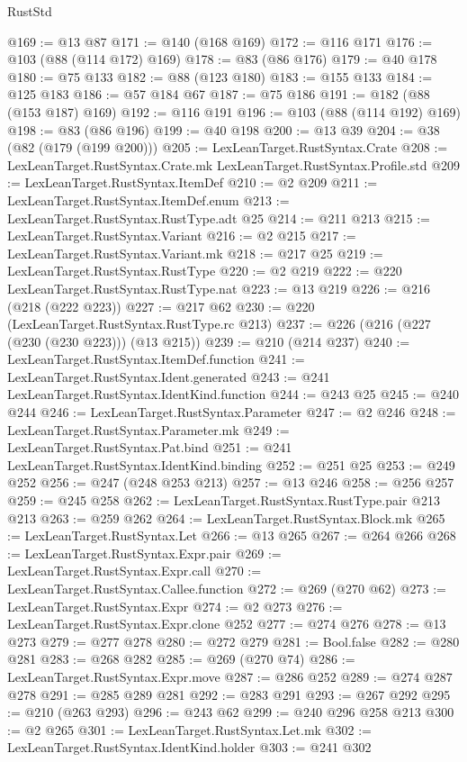 \begin{lexlean}{RustStd}
\begin{coremodule}
@169 := @13 @87
@171 := @140 (@168 @169)
@172 := @116 @171
@176 := @103 (@88 (@114 @172) @169)
@178 := @83 (@86 @176)
@179 := @40 @178
@180 := @75 @133
@182 := @88 (@123 @180)
@183 := @155 @133
@184 := @125 @183
@186 := @57 @184 @67
@187 := @75 @186
@191 := @182 (@88 (@153 @187) @169)
@192 := @116 @191
@196 := @103 (@88 (@114 @192) @169)
@198 := @83 (@86 @196)
@199 := @40 @198
@200 := @13 @39
@204 := @38 (@82 (@179 (@199 @200)))
@205 := LexLeanTarget.RustSyntax.Crate
@208 := LexLeanTarget.RustSyntax.Crate.mk LexLeanTarget.RustSyntax.Profile.std
@209 := LexLeanTarget.RustSyntax.ItemDef
@210 := @2 @209
@211 := LexLeanTarget.RustSyntax.ItemDef.enum
@213 := LexLeanTarget.RustSyntax.RustType.adt @25
@214 := @211 @213
@215 := LexLeanTarget.RustSyntax.Variant
@216 := @2 @215
@217 := LexLeanTarget.RustSyntax.Variant.mk
@218 := @217 @25
@219 := LexLeanTarget.RustSyntax.RustType
@220 := @2 @219
@222 := @220 LexLeanTarget.RustSyntax.RustType.nat
@223 := @13 @219
@226 := @216 (@218 (@222 @223))
@227 := @217 @62
@230 := @220 (LexLeanTarget.RustSyntax.RustType.rc @213)
@237 := @226 (@216 (@227 (@230 (@230 @223))) (@13 @215))
@239 := @210 (@214 @237)
@240 := LexLeanTarget.RustSyntax.ItemDef.function
@241 := LexLeanTarget.RustSyntax.Ident.generated
@243 := @241 LexLeanTarget.RustSyntax.IdentKind.function
@244 := @243 @25
@245 := @240 @244
@246 := LexLeanTarget.RustSyntax.Parameter
@247 := @2 @246
@248 := LexLeanTarget.RustSyntax.Parameter.mk
@249 := LexLeanTarget.RustSyntax.Pat.bind
@251 := @241 LexLeanTarget.RustSyntax.IdentKind.binding
@252 := @251 @25
@253 := @249 @252
@256 := @247 (@248 @253 @213)
@257 := @13 @246
@258 := @256 @257
@259 := @245 @258
@262 := LexLeanTarget.RustSyntax.RustType.pair @213 @213
@263 := @259 @262
@264 := LexLeanTarget.RustSyntax.Block.mk
@265 := LexLeanTarget.RustSyntax.Let
@266 := @13 @265
@267 := @264 @266
@268 := LexLeanTarget.RustSyntax.Expr.pair
@269 := LexLeanTarget.RustSyntax.Expr.call
@270 := LexLeanTarget.RustSyntax.Callee.function
@272 := @269 (@270 @62)
@273 := LexLeanTarget.RustSyntax.Expr
@274 := @2 @273
@276 := LexLeanTarget.RustSyntax.Expr.clone @252
@277 := @274 @276
@278 := @13 @273
@279 := @277 @278
@280 := @272 @279
@281 := Bool.false
@282 := @280 @281
@283 := @268 @282
@285 := @269 (@270 @74)
@286 := LexLeanTarget.RustSyntax.Expr.move
@287 := @286 @252
@289 := @274 @287 @278
@291 := @285 @289 @281
@292 := @283 @291
@293 := @267 @292
@295 := @210 (@263 @293)
@296 := @243 @62
@299 := @240 @296 @258 @213
@300 := @2 @265
@301 := LexLeanTarget.RustSyntax.Let.mk
@302 := LexLeanTarget.RustSyntax.IdentKind.holder
@303 := @241 @302

\end{coremodule}
\end{lexlean}
